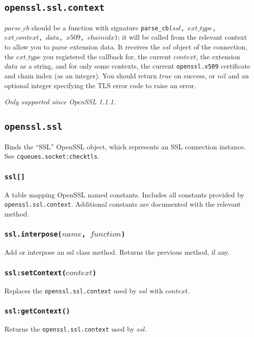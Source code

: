 \documentclass[11pt, oneside]{memoir}
\newcommand*{\fn}[1]{\texttt{#1}\xspace}
\newcommand*{\method}[1]{\texttt{#1}\xspace}
\newcommand*{\module}[1]{\texttt{#1}\xspace}
\newcounter{toccols}
\newenvironment{Module}[1]{
	\subsection{\texttt{#1}}
	\addtocontents{toc}{
		\protect\begin{multicols}{\value{toccols}}
	}
}{
	\addtocontents{toc}{\protect\end{multicols}}
}
\begin{document}
\begin{Module}{openssl.ssl.context}
$parse\_cb$ should be a function with signature \fn{parse\_cb($ssl$, $ext\_type$, $ext\_context$, $data$, $x509$, $chainidx$)}; it will be called from the relevant context to allow you to parse extension data.
It receives the $ssl$ object of the connection, the $ext\_type$ you registered the callback for, the current $context$, the extension $data$ as a string, and for only some contexts, the current \module{openssl.x509} certificate and chain index (as an integer). You should return $true$ on success, or $nil$ and an optional integer specifying the TLS error code to raise an error.

\emph{Only supported since OpenSSL 1.1.1.}

\end{Module}


\begin{Module}{openssl.ssl}

Binds the ``SSL'' OpenSSL object, which represents an SSL connection instance. See \method{cqueues.socket:checktls}.

\subsubsection[\fn{ssl[]}]{\fn{ssl[]}}

A table mapping OpenSSL named constants. Includes all constants provided by \module{openssl.ssl.context}. Additional constants are documented with the relevant method.

\subsubsection[\fn{ssl.interpose}]{\fn{ssl.interpose($name$, $function$)}}
Add or interpose an ssl class method. Returns the previous method, if any.

\subsubsection[\fn{ssl:setContext}]{\fn{ssl:setContext($context$)}}

Replaces the \module{openssl.ssl.context} used by $ssl$ with $context$.

\subsubsection[\fn{ssl:getContext}]{\fn{ssl:getContext()}}

Returns the \module{openssl.ssl.context} used by $ssl$.


\end{Module}
\end{document}
